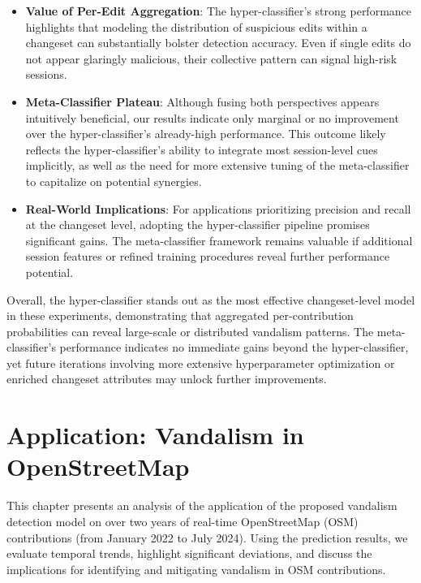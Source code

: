 \documentclass[
    13pt, %
    a4paper, %
    DIV14, %
    listof=totoc, %
    bibliography=totoc, %
    index=totoc, %
    headsepline
]{scrreprt}
\begin{document}
\begin{itemize}
    \item \textbf{Value of Per-Edit Aggregation}:
    The hyper-classifier’s strong performance highlights that modeling the distribution of suspicious edits within a changeset can substantially bolster detection accuracy. Even if single edits do not appear glaringly malicious, their collective pattern can signal high-risk sessions.
    \item \textbf{Meta-Classifier Plateau}:
    Although fusing both perspectives appears intuitively beneficial, our results indicate only marginal or no improvement over the hyper-classifier’s already-high performance. This outcome likely reflects the hyper-classifier’s ability to integrate most session-level cues implicitly, as well as the need for more extensive tuning of the meta-classifier to capitalize on potential synergies.
    \item \textbf{Real-World Implications}:
    For applications prioritizing precision and recall at the changeset level, adopting the hyper-classifier pipeline promises significant gains. The meta-classifier framework remains valuable if additional session features or refined training procedures reveal further performance potential.
\end{itemize}

Overall, the hyper-classifier stands out as the most effective changeset-level model in these experiments, demonstrating that aggregated per-contribution probabilities can reveal large-scale or distributed vandalism patterns. The meta-classifier’s performance indicates no immediate gains beyond the hyper-classifier, yet future iterations involving more extensive hyperparameter optimization or enriched changeset attributes may unlock further improvements.



\chapter{Application: Vandalism in OpenStreetMap} \label{chapter:application}

This chapter presents an analysis of the application of the proposed vandalism detection model on over two years of real-time OpenStreetMap (OSM) contributions (from January 2022 to July 2024). Using the prediction results, we evaluate temporal trends, highlight significant deviations, and discuss the implications for identifying and mitigating vandalism in OSM contributions.
\end{document}
